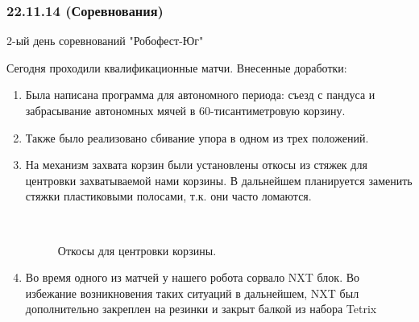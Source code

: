 \subsubsection{22.11.14 (Соревнования)}
\begin{center}
	2-ый день соревнований "Робофест-Юг"
\end{center}
Сегодня проходили квалификационные матчи.
\newline 
Внесенные  доработки:
\begin{enumerate}
	\item Была написана программа для автономного периода: съезд с пандуса и забрасывание автономных мячей в 60-тисантиметровую корзину.
	\item Также было реализовано сбивание упора в одном из трех положений.
	\item На механизм захвата корзин были установлены откосы из стяжек для центровки захватываемой нами корзины. В дальнейшем планируется заменить стяжки  пластиковыми полосами, т.к. они часто ломаются.
	\begin{figure}[H]
		\begin{minipage}[h]{0.2\linewidth}
			\center  
		\end{minipage}
		\begin{minipage}[h]{0.6\linewidth}
			\caption{Откосы для центровки корзины.
			}
		\end{minipage}
	\end{figure}
	\item Во время одного из матчей у нашего робота сорвало NXT блок. Во избежание возникновения таких ситуаций в дальнейшем, NXT был дополнительно закреплен на резинки и закрыт балкой из набора Tetrix

\end{enumerate}

